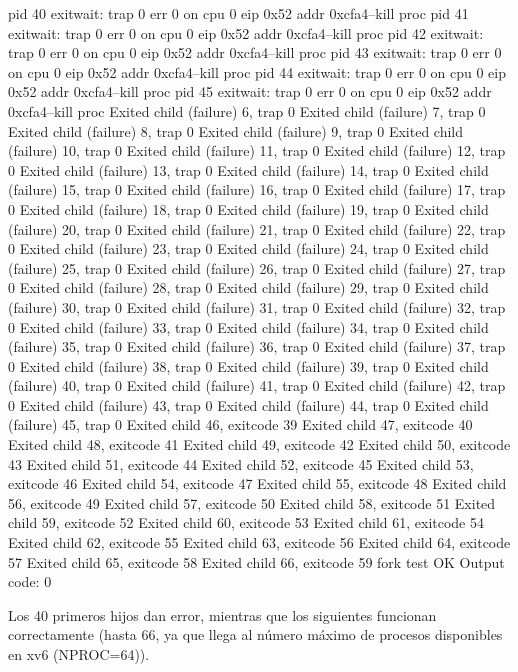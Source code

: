 \begin{listing}[style=consola]
    pid 40 exitwait: trap 0 err 0 on cpu 0 eip 0x52 addr 0xcfa4--kill proc
    pid 41 exitwait: trap 0 err 0 on cpu 0 eip 0x52 addr 0xcfa4--kill proc
    pid 42 exitwait: trap 0 err 0 on cpu 0 eip 0x52 addr 0xcfa4--kill proc
    pid 43 exitwait: trap 0 err 0 on cpu 0 eip 0x52 addr 0xcfa4--kill proc
    pid 44 exitwait: trap 0 err 0 on cpu 0 eip 0x52 addr 0xcfa4--kill proc
    pid 45 exitwait: trap 0 err 0 on cpu 0 eip 0x52 addr 0xcfa4--kill proc
    Exited child (failure) 6, trap 0
    Exited child (failure) 7, trap 0
    Exited child (failure) 8, trap 0
    Exited child (failure) 9, trap 0
    Exited child (failure) 10, trap 0
    Exited child (failure) 11, trap 0
    Exited child (failure) 12, trap 0
    Exited child (failure) 13, trap 0
    Exited child (failure) 14, trap 0
    Exited child (failure) 15, trap 0
    Exited child (failure) 16, trap 0
    Exited child (failure) 17, trap 0
    Exited child (failure) 18, trap 0
    Exited child (failure) 19, trap 0
    Exited child (failure) 20, trap 0
    Exited child (failure) 21, trap 0
    Exited child (failure) 22, trap 0
    Exited child (failure) 23, trap 0
    Exited child (failure) 24, trap 0
    Exited child (failure) 25, trap 0
    Exited child (failure) 26, trap 0
    Exited child (failure) 27, trap 0
    Exited child (failure) 28, trap 0
    Exited child (failure) 29, trap 0
    Exited child (failure) 30, trap 0
    Exited child (failure) 31, trap 0
    Exited child (failure) 32, trap 0
    Exited child (failure) 33, trap 0
    Exited child (failure) 34, trap 0
    Exited child (failure) 35, trap 0
    Exited child (failure) 36, trap 0
    Exited child (failure) 37, trap 0
    Exited child (failure) 38, trap 0
    Exited child (failure) 39, trap 0
    Exited child (failure) 40, trap 0
    Exited child (failure) 41, trap 0
    Exited child (failure) 42, trap 0
    Exited child (failure) 43, trap 0
    Exited child (failure) 44, trap 0
    Exited child (failure) 45, trap 0
    Exited child 46, exitcode 39
    Exited child 47, exitcode 40
    Exited child 48, exitcode 41
    Exited child 49, exitcode 42
    Exited child 50, exitcode 43
    Exited child 51, exitcode 44
    Exited child 52, exitcode 45
    Exited child 53, exitcode 46
    Exited child 54, exitcode 47
    Exited child 55, exitcode 48
    Exited child 56, exitcode 49
    Exited child 57, exitcode 50
    Exited child 58, exitcode 51
    Exited child 59, exitcode 52
    Exited child 60, exitcode 53
    Exited child 61, exitcode 54
    Exited child 62, exitcode 55
    Exited child 63, exitcode 56
    Exited child 64, exitcode 57
    Exited child 65, exitcode 58
    Exited child 66, exitcode 59
    fork test OK
    Output code: 0
\end{listing}

\par Los 40 primeros hijos dan error, mientras que los siguientes
funcionan correctamente (hasta 66, ya que llega al número máximo
de procesos disponibles en xv6 (NPROC=64)).